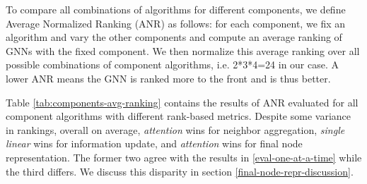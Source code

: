 \documentclass{article}
\begin{document}
To compare all combinations of algorithms for different components, we define Average Normalized Ranking (ANR) as follows: for each component, we fix an algorithm and vary the other components and compute an average ranking of GNNs with the fixed component. We then normalize this average ranking over all possible combinations of component algorithms, i.e. 2*3*4=24 in our case.  A lower ANR means the GNN is ranked more to the front and is thus better. 

Table \ref{tab:components-avg-ranking} contains the results of ANR evaluated for all component algorithms with different rank-based metrics. Despite some variance in rankings, overall on average, \textit{attention} wins for neighbor aggregation, \textit{single linear} wins for information update, and \textit{attention} wins for final node representation. The former two agree with the results in \ref{eval-one-at-a-time} while the third differs. We discuss this disparity in section \ref{final-node-repr-discussion}.





\end{document}
